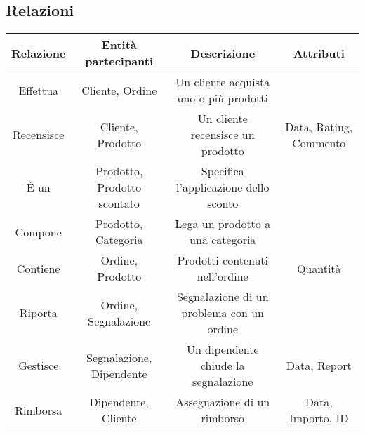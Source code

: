 \subsection{Relazioni}
\begin{center}
\begin{tabular}{ |c|c|c|c|} 
\hline
Relazione & Entità partecipanti & Descrizione & Attributi \\
\hline
\multirow{3}{6em}{Effettua} & \multirow{3}{12em}{Cliente, Ordine} & \multirow{3}{8em}{Un cliente acquista uno o più prodotti} & \multirow{3}{12em}{} \\
 &  &  & \\
 &  &  & \\
\hline

\multirow{3}{6em}{Recensisce} & \multirow{3}{12em}{Cliente, Prodotto} & \multirow{3}{8em}{Un cliente recensisce un prodotto} & \multirow{3}{12em}{Data, Rating, Commento} \\
 &  &  & \\
 &  &  & \\
\hline

\multirow{3}{6em}{È un} & \multirow{3}{12em}{Prodotto, Prodotto scontato} & \multirow{3}{8em}{Specifica l'applicazione dello sconto} & \multirow{3}{12em}{} \\
 &  &  & \\
 &  &  & \\
\hline

\multirow{3}{6em}{Compone} & \multirow{3}{12em}{Prodotto, Categoria} & \multirow{3}{8em}{Lega un prodotto a una categoria} & \multirow{3}{12em}{} \\
 &  &  & \\
 &  &  & \\ 
\hline

\multirow{3}{6em}{Contiene} & \multirow{3}{12em}{Ordine, Prodotto} & \multirow{3}{8em}{Prodotti contenuti nell'ordine} & \multirow{3}{12em}{Quantità} \\
 &  &  & \\
 &  &  & \\
\hline

\multirow{3}{6em}{Riporta} & \multirow{3}{12em}{Ordine, Segnalazione} & \multirow{3}{8em}{Segnalazione di un problema con un ordine} & \multirow{3}{12em}{} \\
 &  &  & \\
 &  &  & \\
\hline

\multirow{3}{6em}{Gestisce} & \multirow{3}{12em}{Segnalazione, Dipendente} & \multirow{3}{8em}{Un dipendente chiude la segnalazione} & \multirow{3}{12em}{Data, Report} \\
&  &  & \\
&  &  & \\ 
\hline

\multirow{3}{6em}{Rimborsa} & \multirow{3}{12em}{Dipendente, Cliente} & \multirow{3}{8em}{Assegnazione di un rimborso} & \multirow{3}{12em}{Data, Importo, ID} \\
&  &  & \\
&  &  & \\ 
\hline
\end{tabular}
\end{center}